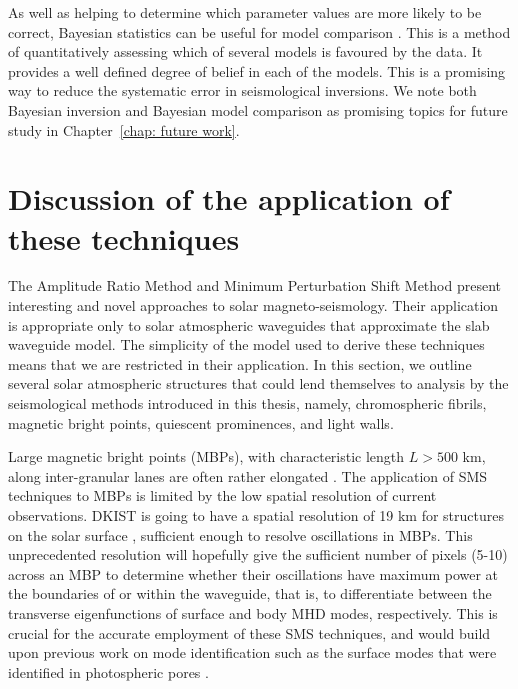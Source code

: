 \documentclass[12pt]{../style-files/ociamthesis}
\begin{document}
As well as helping to determine which parameter values are more likely to be correct, Bayesian statistics can be useful for model comparison \citep{arr_etal18}. This is a method of quantitatively assessing which of several models is favoured by the data. It provides a well defined degree of belief in each of the models. This is a promising way to reduce the systematic error in seismological inversions. We note both Bayesian inversion and Bayesian model comparison as promising topics for future study in Chapter~\ref{chap: future work}.


\section{Discussion of the application of these techniques}
\label{sec: SMS discussion}

The Amplitude Ratio Method and Minimum Perturbation Shift Method present interesting and novel approaches to solar magneto-seismology. Their application is appropriate only to solar atmospheric waveguides that approximate the slab waveguide model. The simplicity of the model used to derive these techniques means that we are restricted in their application. In this section, we outline several solar atmospheric structures that could lend themselves to analysis by the seismological methods introduced in this thesis, namely, chromospheric fibrils, magnetic bright points, quiescent prominences, and light walls.



Large magnetic bright points (MBPs), with characteristic length $L > 500$ km, along inter-granular lanes are often rather elongated \citep{cro_etal10}. The application of SMS techniques to MBPs is limited by the low spatial resolution of current observations. DKIST is going to have a spatial resolution of 19 km for structures on the solar surface \citep{tri_etal15}, sufficient enough to resolve oscillations in MBPs. This unprecedented resolution will hopefully give the sufficient number of pixels (5-10) across an MBP to determine whether their oscillations have maximum power at the boundaries of or within the waveguide, that is, to differentiate between the transverse eigenfunctions of surface and body MHD modes, respectively. This is crucial for the accurate employment of these SMS techniques, and would build upon previous work on mode identification such as the surface modes that were identified in photospheric pores \citep{mor_etal15}.
\end{document}
